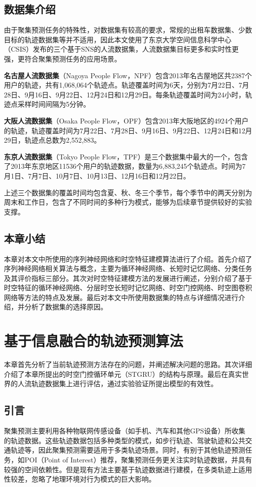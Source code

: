 \documentclass[master]{thesis-uestc}
\begin{document}
\section{数据集介绍}
由于聚集预测任务的特殊性，对数据集有较高的要求，常规的出租车数据集、少数目标的轨迹数据集等并不适用，因此本文使用了东京大学空间信息科学中心（CSIS）发布的三个基于SNS的人流数据集，人流数据集目标更多和实时性更强，更符合聚集预测任务的应用场景。

\textbf{名古屋人流数据集}（Nagoya People Flow，NPF）包含2013年名古屋地区共2387个用户的轨迹，共有1,068,064个轨迹点。轨迹覆盖时间为6天，分别为7月22日、7月28日、9月16日、9月22日、12月24日和12月29日。每条轨迹覆盖时间为24小时，轨迹点采样时间间隔为5分钟。

\textbf{大阪人流数据集}（Osaka People Flow，OPF）包含2013年大阪地区的4924个用户的轨迹，轨迹覆盖时间为7月22日、7月28日、9月16日、9月22日、12月24日和12月29日，轨迹点总数为2,552,883。

\textbf{东京人流数据集}（Tokyo People Flow，TPF）是三个数据集中最大的一个，包含了2013年东京地区11536个用户的轨迹数据，数量为6,883,245个轨迹点。时间为7月1日、7月7日、10月7日、10月13日、12月16日和12月22日。

上述三个数据集的覆盖时间均包含夏、秋、冬三个季节，每个季节中的两天分别为周末和工作日，包含了不同时间的多种行为模式，能够为后续章节提供较好的实验支撑。

\section{本章小结}
本章对本文中所使用的序列神经网络和时空特征建模算法进行了介绍。首先介绍了序列神经网络相关算法与概念，主要为循环神经网络、长短时记忆网络、分类任务及其评价指标三部分。其次对时空特征建模方法的发展进行阐述，分别介绍了基于时空特征的循环神经网络、分层时空长短时记忆网络、时空门控网络、时空图卷积网络等方法的特点及发展。最后对本文中所使用数据集的特点与详细情况进行介绍，并分析了数据集的选择原因。

\chapter{基于信息融合的轨迹预测算法}
本章首先分析了当前轨迹预测方法存在的问题，并阐述解决问题的思路。其次详细介绍了本章所提出的时空门控循环单元（STGRU）的结构与原理。最后在真实世界的人流轨迹数据集上进行评估，通过实验验证所提出模型的有效性。

\section{引言}
聚集预测主要利用各种物联网传感设备（如手机、汽车和其他GPS设备）所收集的轨迹数据。这些轨迹数据包括多种类型的模式，如步行轨迹、驾驶轨迹和公共交通轨迹等，因此聚集预测需要适用于多类轨迹场景。同时，有别于其他轨迹预测任务，如POI（Point of Interest）推荐，聚集预测任务更关注实时轨迹数据，并具有较强的空间依赖性。但是现有方法主要基于轨迹数据进行建模，在多类轨迹上适用性较差，忽略了地理环境对行为模式的巨大影响。
\end{document}
